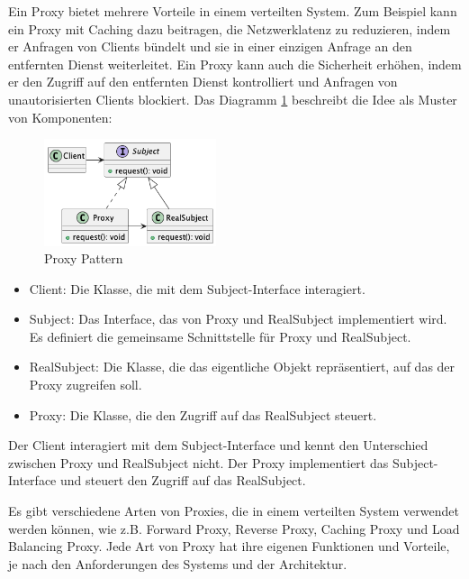 Ein Proxy bietet mehrere Vorteile in einem verteilten System. Zum Beispiel kann ein Proxy mit Caching dazu beitragen, die Netzwerklatenz zu reduzieren, indem er Anfragen von Clients bündelt und sie in einer einzigen Anfrage an den entfernten Dienst weiterleitet. Ein Proxy kann auch die Sicherheit erhöhen, indem er den Zugriff auf den entfernten Dienst kontrolliert und Anfragen von unautorisierten Clients blockiert. Das Diagramm \ref{fig:proxy} beschreibt die Idee als Muster von Komponenten:
\begin{figure}[ht]
  \centering
  \includegraphics[width=0.45\textwidth]{fig/uml/proxy.png}
  \caption{Proxy Pattern}
  \label{fig:proxy}
\end{figure}
\begin{itemize}
\item Client: Die Klasse, die mit dem Subject-Interface interagiert.
\item  Subject: Das Interface, das von Proxy und RealSubject implementiert wird. Es definiert die gemeinsame Schnittstelle für Proxy und RealSubject.
\item RealSubject: Die Klasse, die das eigentliche Objekt repräsentiert, auf das der Proxy zugreifen soll.
\item Proxy: Die Klasse, die den Zugriff auf das RealSubject steuert.
\end{itemize}

Der Client interagiert mit dem Subject-Interface und kennt den Unterschied zwischen Proxy und RealSubject nicht. Der Proxy implementiert das Subject-Interface und steuert den Zugriff auf das RealSubject.

Es gibt verschiedene Arten von Proxies, die in einem verteilten System verwendet werden können, wie z.B. Forward Proxy, Reverse Proxy, Caching Proxy und Load Balancing Proxy. Jede Art von Proxy hat ihre eigenen Funktionen und Vorteile, je nach den Anforderungen des Systems und der Architektur.

